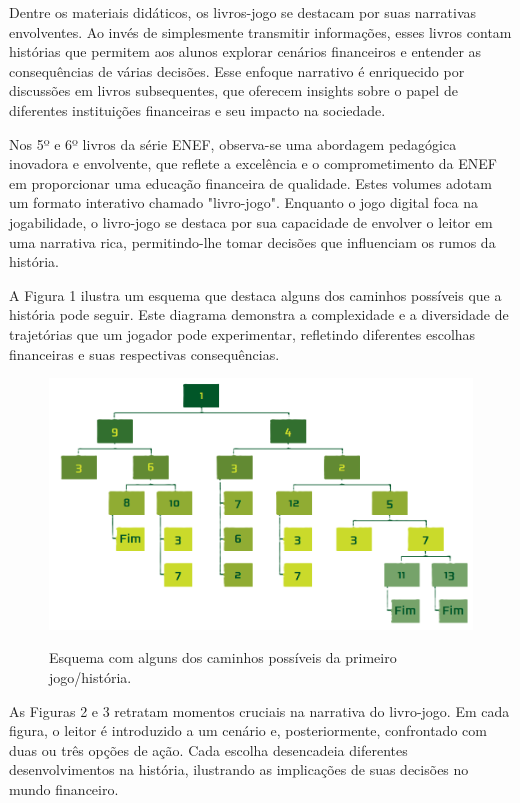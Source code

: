 Dentre os materiais didáticos, os livros-jogo se destacam por suas narrativas envolventes. Ao invés de simplesmente transmitir informações, esses livros contam histórias que permitem aos alunos explorar cenários financeiros e entender as consequências de várias decisões. Esse enfoque narrativo é enriquecido por discussões em livros subsequentes, que oferecem insights sobre o papel de diferentes instituições financeiras e seu impacto na sociedade.

Nos 5º e 6º livros da série ENEF, observa-se uma abordagem pedagógica inovadora e envolvente, que reflete a excelência e o comprometimento da ENEF em proporcionar uma educação financeira de qualidade. Estes volumes adotam um formato interativo chamado "livro-jogo". Enquanto o jogo digital foca na jogabilidade, o livro-jogo se destaca por sua capacidade de envolver o leitor em uma narrativa rica, permitindo-lhe tomar decisões que influenciam os rumos da história.

A Figura 1 ilustra um esquema que destaca alguns dos caminhos possíveis que a história pode seguir. Este diagrama demonstra a complexidade e a diversidade de trajetórias que um jogador pode experimentar, refletindo diferentes escolhas financeiras e suas respectivas consequências.

\begin{figure}[ht]
	\centering
	\caption{Esquema com alguns dos caminhos possíveis da primeiro jogo/história.}
	\includegraphics[scale=0.3]{Textuais/Pictures/Picture1.png}
	\label{fig:figure-1}
\end{figure}

As Figuras 2 e 3 retratam momentos cruciais na narrativa do livro-jogo. Em cada figura, o leitor é introduzido a um cenário e, posteriormente, confrontado com duas ou três opções de ação. Cada escolha desencadeia diferentes desenvolvimentos na história, ilustrando as implicações de suas decisões no mundo financeiro.

